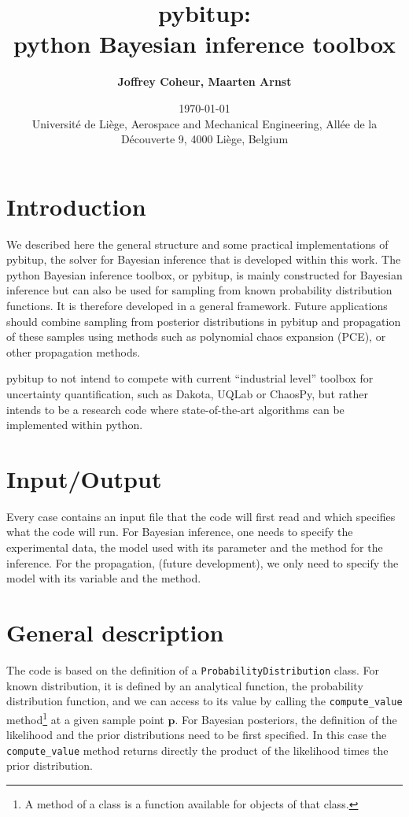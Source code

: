 \documentclass[a4paper,11pt]{article}
\title{\huge \textbf{pybitup: \\ python Bayesian inference toolbox}}
\author{\textbf{Joffrey Coheur, Maarten Arnst}}
\date{\today \\ 
\vspace{50pt}
Universit\'e de Li\`ege, Aerospace and Mechanical Engineering, All\'ee de la D\'ecouverte 9, 4000 Li\`ege, Belgium}
\begin{document}
\begin{titlepage}
\maketitle
\end{titlepage}

\section{Introduction} 

We described here the general structure and some practical implementations of pybitup, the solver for Bayesian inference that is developed within this work. The python Bayesian inference toolbox, or pybitup, is mainly constructed for Bayesian inference but can also be used for sampling from known probability distribution functions. It is therefore developed in a general framework. Future applications should combine sampling from posterior distributions in pybitup and propagation of these samples using methods such as polynomial chaos expansion (PCE), or other propagation methods. 

pybitup to not intend to compete with current ``industrial level'' toolbox for uncertainty quantification, such as Dakota, UQLab or ChaosPy, but rather intends to be a research code where state-of-the-art algorithms can be implemented within python.




 

\section{Input/Output} 

Every case contains an input file that the code will first read and which specifies what the code will run. For Bayesian inference, one needs to specify the experimental data, the model used with its parameter and the method for the inference. For the propagation, (future development), we only need to specify the model with its variable and the method. 


\section{General description} 

The code is based on the definition of a \texttt{ProbabilityDistribution} class. For known distribution, it is defined by an analytical function, the probability distribution function, and we can access to its value by calling the \texttt{compute\_value} method\footnote{A method of a class is a function available for objects of that class.} at a given sample point $\textbf{p}$. For Bayesian posteriors, the definition of the likelihood and the prior distributions need to be first specified. In this case the \texttt{compute\_value} method returns directly the product of the likelihood times the prior distribution. 
\end{document}
